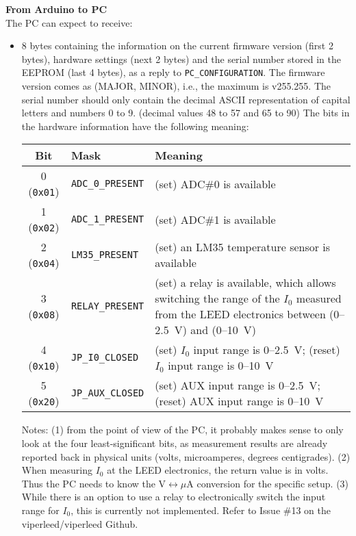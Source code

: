 \documentclass[11pt,a4paper,english]{article}
\begin{document}
\vspace*{\baselineskip}
\noindent\textbf{From Arduino to PC}\\The PC can expect to receive:
\begin{itemize}
\item 8 bytes containing the information on the current firmware version (first 2 bytes), hardware settings (next 2 bytes) and the serial number stored in the EEPROM (last 4 bytes), as a reply to \texttt{PC\_CONFIGURATION}. The firmware version comes as (MAJOR, MINOR), i.e., the maximum is v255.255. The serial number should only contain the decimal ASCII representation of capital letters and numbers 0 to 9. (decimal values 48 to 57 and 65 to 90) The bits in the hardware information have the following meaning:
	  \begin{center}
	  \begin{tabular}{clp{}}\toprule
	  Bit 				 & Mask                     & Meaning\\
	  \midrule
	  0 (\texttt{0x01})  & \texttt{ADC\_0\_PRESENT} & (set) ADC\#0 is available \\
	  1 (\texttt{0x02})  & \texttt{ADC\_1\_PRESENT} & (set) ADC\#1 is available \\
	  2 (\texttt{0x04})  & \texttt{LM35\_PRESENT}   & (set) an LM35 temperature sensor is available \\
	  3 (\texttt{0x08})  & \texttt{RELAY\_PRESENT}  & (set) a relay is available, which allows switching the range of the $I_0$ measured from the LEED electronics between (0--2.5~V) and (0--10~V)\\
	  4 (\texttt{0x10})  & \texttt{JP\_I0\_CLOSED}  & (set) $I_0$ input range is 0--2.5~V; (reset) $I_0$ input range is 0--10~V\\
	  5 (\texttt{0x20})  & \texttt{JP\_AUX\_CLOSED} & (set) AUX input range is 0--2.5~V; (reset) AUX input range is 0--10~V\\
	  \bottomrule
	  \end{tabular}
	  \end{center}
      
      Notes: (1) from the point of view of the PC, it probably makes sense to only look at the four least-significant bits, as measurement results are already reported back in physical units (volts, microamperes, degrees centigrades). (2) When measuring $I_0$ at the LEED electronics, the return value is in volts. Thus the PC needs to know the V$\leftrightarrow\mu$A conversion for the specific setup. (3) While there is an option to use a relay to electronically switch the input range for $I_0$, this is currently not implemented. Refer to Issue \#13 on the viperleed/viperleed Github.


\end{itemize}
\end{document}
